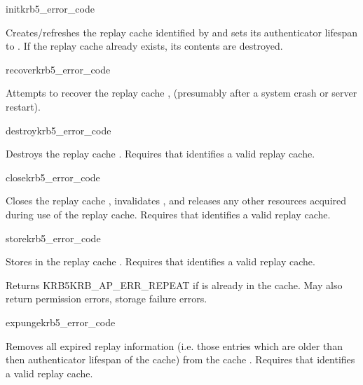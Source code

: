 \begin{funcdecl}{init}{krb5_error_code}{\funcin}
\end{funcdecl}

Creates/refreshes the replay cache identified by  and sets its
authenticator lifespan to .  If the 
replay cache already exists, its contents are destroyed.


\begin{funcdecl}{recover}{krb5_error_code}{\funcin}
\end{funcdecl}
Attempts to recover the replay cache , (presumably after a
system crash or server restart).


\begin{funcdecl}{destroy}{krb5_error_code}{\funcin}
\end{funcdecl}

Destroys the replay cache .
Requires that  identifies a valid replay cache.


\begin{funcdecl}{close}{krb5_error_code}{\funcin}
\end{funcdecl}

Closes the replay cache , invalidates ,
and releases any other resources acquired during use of the replay cache.
Requires that  identifies a valid replay cache.


\begin{funcdecl}{store}{krb5_error_code}{\funcin}
\end{funcdecl}
Stores  in the replay cache .
Requires that  identifies a valid replay cache.

Returns KRB5KRB_AP_ERR_REPEAT if  is already in the
cache.  May also return permission errors, storage failure errors.

\begin{funcdecl}{expunge}{krb5_error_code}{\funcin}
\end{funcdecl}
Removes all expired replay information (i.e. those entries which are
older than then authenticator lifespan of the cache) from the cache
.  Requires that  identifies a valid replay
cache.

